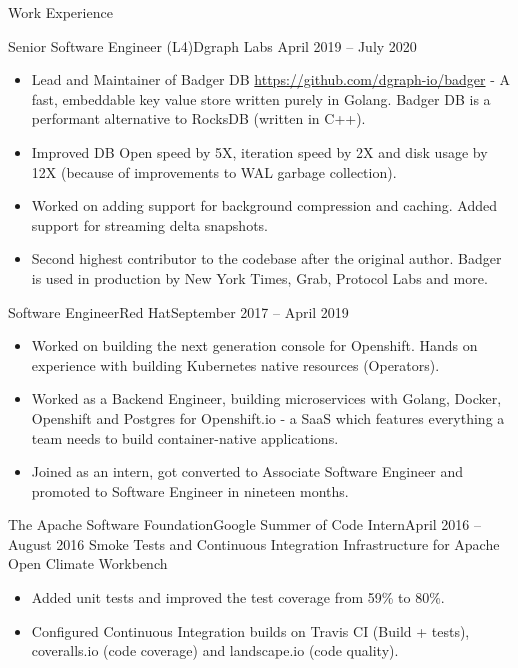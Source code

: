 \documentclass[]{mcdowellcv}
\begin{document}
\begin{cvsection}{Work Experience}
		\begin{cvsubsection}{Senior Software Engineer (L4)}{Dgraph Labs}{ April 2019 -- July 2020}
			\begin{itemize}
				\item Lead and Maintainer of Badger DB \href{https://github.com/dgraph-io/badger}{https://github.com/dgraph-io/badger} - A fast, embeddable key value store written purely in Golang. Badger DB is a performant alternative to RocksDB (written in C++).
				\item Improved DB Open speed by 5X, iteration speed by 2X and disk usage by 12X (because of improvements to WAL garbage collection).
				\item Worked on adding support for background compression and caching. Added support for streaming delta snapshots.
				\item Second highest contributor to the codebase after the original author. Badger is used in production by New York Times, Grab, Protocol Labs and more.
			\end{itemize}
		\end{cvsubsection}
		\begin{cvsubsection}{Software Engineer}{Red Hat}{September 2017 -- April 2019}
			\begin{itemize}
				\item Worked on building the next generation console for Openshift. Hands on experience with building Kubernetes native resources (Operators).
				\item Worked as a Backend Engineer, building microservices with Golang, Docker, Openshift and Postgres for Openshift.io - a SaaS which features everything a team needs to build container-native applications.
				\item Joined as an intern, got converted to Associate Software Engineer and promoted to Software Engineer in nineteen months.
			\end{itemize}
		\end{cvsubsection}
		\begin{cvsubsection}{The Apache Software Foundation}{Google Summer of Code Intern}{April 2016 -- August 2016}
Smoke Tests and Continuous Integration Infrastructure for Apache Open Climate Workbench
			\begin{itemize}
				\item Added unit tests and improved the test coverage from 59\% to 80\%.
				\item Configured Continuous Integration builds on Travis CI (Build + tests), coveralls.io (code coverage) and landscape.io (code quality).

\end{itemize}
\end{cvsubsection}
\end{cvsection}
\end{document}
